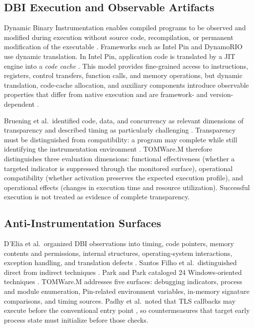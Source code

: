 \documentclass[pdflatex,sn-mathphys-num]{sn-jnl}
\theoremstyle{thmstyleone}
\theoremstyle{thmstyletwo}
\theoremstyle{thmstylethree}
\begin{document}
\subsection{DBI Execution and Observable Artifacts}

Dynamic Binary Instrumentation enables compiled programs to be observed and modified during execution without source code, recompilation, or permanent modification of the executable \cite{luk2005pin,delia2019sok}. Frameworks such as Intel Pin and DynamoRIO use dynamic translation. In Intel Pin, application code is translated by a JIT engine into a \textit{code cache} \cite{luk2005pin,delia2019sok}. This model provides fine-grained access to instructions, registers, control transfers, function calls, and memory operations, but dynamic translation, code-cache allocation, and auxiliary components introduce observable properties that differ from native execution and are framework- and version-dependent \cite{park2024detection,delia2022evaluating}.

Bruening et al.\ identified code, data, and concurrency as relevant dimensions of transparency and described timing as particularly challenging \cite{bruening2012transparent}. Transparency must be distinguished from compatibility: a program may complete while still identifying the instrumentation environment \cite{delia2019sok,delia2022evaluating}. TOMWare.M therefore distinguishes three evaluation dimensions: functional effectiveness (whether a targeted indicator is suppressed through the monitored surface), operational compatibility (whether activation preserves the expected execution profile), and operational effects (changes in execution time and resource utilization). Successful execution is not treated as evidence of complete transparency.

\subsection{Anti-Instrumentation Surfaces}

D'Elia et al.\ organized DBI observations into timing, code pointers, memory contents and permissions, internal structures, operating-system interactions, exception handling, and translation defects \cite{delia2019sok}. Santos Filho et al.\ distinguished direct from indirect techniques \cite{GiorgioC2022}. Park and Park cataloged 24 Windows-oriented techniques \cite{park2024detection}. TOMWare.M addresses five surfaces: debugging indicators, process and module enumeration, Pin-related environment variables, in-memory signature comparisons, and timing sources. Padhy et al.\ noted that TLS callbacks may execute before the conventional entry point \cite{padhy2025threat}, so countermeasures that target early process state must initialize before those checks.
\end{document}
